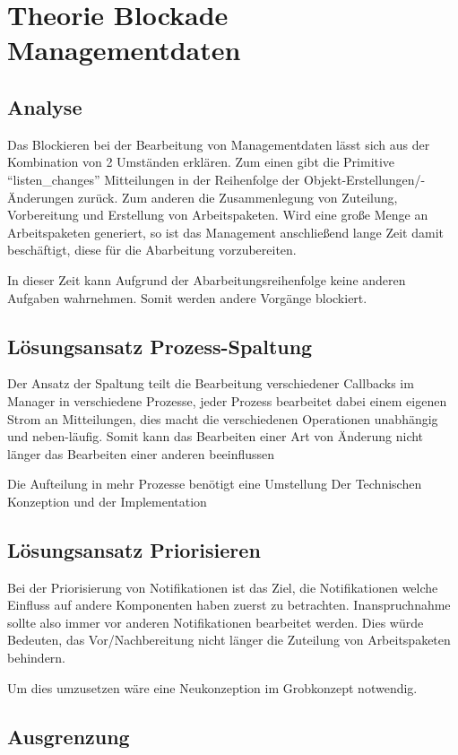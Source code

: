 \section{Theorie Blockade Managementdaten}
\subsection{Analyse}
Das Blockieren bei der Bearbeitung von Managementdaten lässt sich
aus der Kombination von 2 Umständen erklären.
Zum einen gibt die Primitive ``listen\_changes'' Mitteilungen
in der Reihenfolge der Objekt-Erstellungen/-Änderungen zurück.
Zum anderen die Zusammenlegung von Zuteilung, Vorbereitung
und Erstellung von Arbeitspaketen.
Wird eine große Menge an Arbeitspaketen generiert,
so ist das Management anschließend lange Zeit damit beschäftigt,
diese für die Abarbeitung vorzubereiten.

In dieser Zeit kann Aufgrund der Abarbeitungsreihenfolge
keine anderen Aufgaben wahrnehmen.
Somit werden andere Vorgänge blockiert.

\subsection{Lösungsansatz Prozess-Spaltung}

Der Ansatz der Spaltung teilt die Bearbeitung verschiedener Callbacks im Manager
in verschiedene Prozesse, jeder Prozess bearbeitet dabei einem eigenen Strom an Mitteilungen, dies macht die verschiedenen Operationen unabhängig und neben-läufig.
Somit kann das Bearbeiten einer Art von Änderung nicht länger das Bearbeiten einer anderen beeinflussen 

Die Aufteilung in mehr Prozesse benötigt eine Umstellung Der Technischen Konzeption und der Implementation

\subsection{Lösungsansatz Priorisieren}

Bei der Priorisierung von Notifikationen ist das Ziel,
die Notifikationen welche Einfluss auf andere Komponenten haben zuerst zu betrachten.
Inanspruchnahme sollte also immer vor anderen Notifikationen bearbeitet werden.
Dies würde Bedeuten, das Vor/Nachbereitung nicht länger die Zuteilung von Arbeitspaketen behindern.

Um dies umzusetzen wäre eine Neukonzeption im Grobkonzept notwendig.


\subsection{Ausgrenzung}


